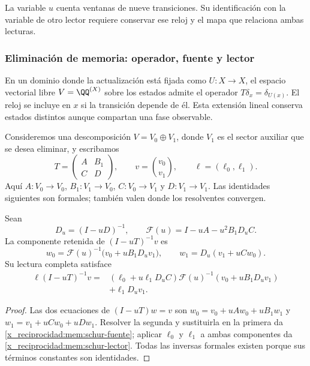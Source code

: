La variable \(u\) cuenta ventanas de nueve transiciones. Su identificación
con la variable de otro lector requiere conservar ese reloj y el mapa
que relaciona ambas lecturas.

\subsubsection{Eliminación de memoria: operador, fuente y lector}

En un dominio donde la actualización está fijada como \(U:X\to X\),
el espacio vectorial libre \(V=\QQ^{(X)}\) sobre los estados admite el operador
\(T\delta_x=\delta_{U(x)}\). El reloj se incluye en \(x\) si la
transición depende de él. Esta extensión lineal conserva estados
distintos aunque compartan una fase observable.

Consideremos una descomposición \(V=V_0\oplus V_1\), donde \(V_1\)
es el sector auxiliar que se desea eliminar, y escribamos
\[
 T=\begin{pmatrix}A&B_1\\C&D\end{pmatrix},\qquad
 v=\binom{v_0}{v_1},\qquad \ell=(\ell_0,\ell_1).
\]
Aquí \(A:V_0\to V_0\), \(B_1:V_1\to V_0\),
\(C:V_0\to V_1\) y \(D:V_1\to V_1\).
Las identidades siguientes son formales; también valen donde los
resolventes convergen.

\begin{proposition}
\label{x_reciprocidad:mem:prop-schur}
Sean
\[
 D_u=(I-uD)^{-1},\qquad
 \mathscr F(u)=I-uA-u^2B_1D_uC.
\]
La componente retenida de \((I-uT)^{-1}v\) es
\begin{equation}
 w_0=\mathscr F(u)^{-1}\bigl(v_0+uB_1D_uv_1\bigr),
 \qquad w_1=D_u(v_1+uCw_0).
 \label{x_reciprocidad:mem:schur-fuente}
\end{equation}
Su lectura completa satisface
\begin{equation}
 \begin{split}
 \ell(I-uT)^{-1}v
 ={}&(\ell_0+u\ell_1D_uC)
       \mathscr F(u)^{-1}(v_0+uB_1D_uv_1)\\
    &+\ell_1D_uv_1.
 \end{split}
 \label{x_reciprocidad:mem:schur-lector}
\end{equation}
\end{proposition}
\begin{proof}
Las dos ecuaciones de \((I-uT)w=v\) son
\(w_0=v_0+uAw_0+uB_1w_1\) y
\(w_1=v_1+uCw_0+uDw_1\).
Resolver la segunda y sustituirla en la primera da
\eqref{x_reciprocidad:mem:schur-fuente}; aplicar \(\ell_0\) y \(\ell_1\)
a ambas componentes da \eqref{x_reciprocidad:mem:schur-lector}.
Todas las inversas formales existen porque sus términos constantes
son identidades.
\end{proof}

